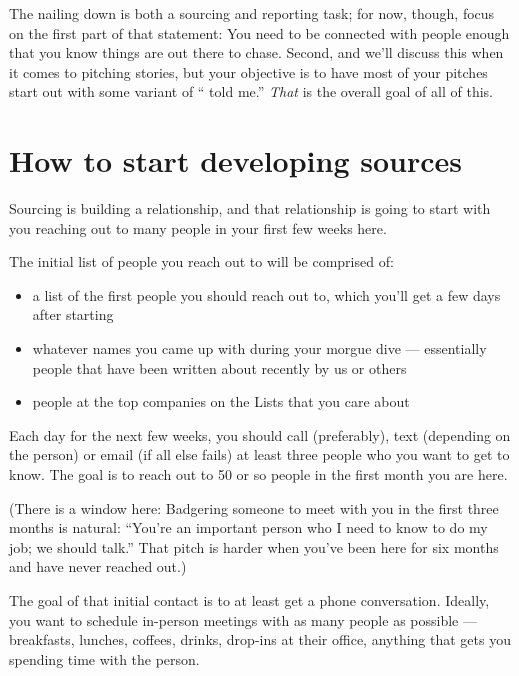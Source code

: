 \documentclass[
  11pt,
  american,
  letterpaperpaper,
  extrafontsizes,onecolumn,openright
  ]{memoir}
\providecommand{\tightlist}{%
  \setlength{\itemsep}{0pt}\setlength{\parskip}{0pt}}
\begin{document}
The nailing down is both a sourcing and reporting task; for now, though, focus on the first part of that statement: You need to be connected with people enough that you know things are out there to chase. Second, and we'll discuss this when it comes to pitching stories, but your objective is to have most of your pitches start out with some variant of \enquote{ told me.} \emph{That} is the overall goal of all of this.

\hypertarget{how-to-start-developing-sources}{%
\section*{How to start developing sources}\label{how-to-start-developing-sources}}

Sourcing is building a relationship, and that relationship is going to start with you reaching out to many people in your first few weeks here.

The initial list of people you reach out to will be comprised of:

\begin{itemize}
\tightlist
\item
  a list of the first people you should reach out to, which you'll get a few days after starting
\item
  whatever names you came up with during your morgue dive --- essentially people that have been written about recently by us or others
\item
  people at the top companies on the Lists that you care about
\end{itemize}

Each day for the next few weeks, you should call (preferably), text (depending on the person) or email (if all else fails) at least three people who you want to get to know. The goal is to reach out to 50 or so people in the first month you are here.

(There is a window here: Badgering someone to meet with you in the first three months is natural: \enquote{You're an important person who I need to know to do my job; we should talk.} That pitch is harder when you've been here for six months and have never reached out.)

The goal of that initial contact is to at least get a phone conversation. Ideally, you want to schedule in-person meetings with as many people as possible --- breakfasts, lunches, coffees, drinks, drop-ins at their office, anything that gets you spending time with the person.
\end{document}
